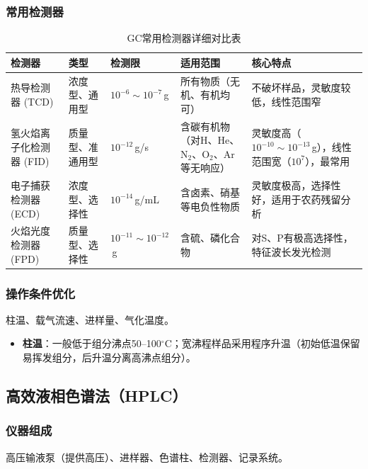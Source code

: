 \documentclass[11pt,a4paper]{article}
\begin{document}
\subsubsection{常用检测器}
\begin{table}[htbp]
\centering
\small
\begin{tabular}{>{\raggedright\arraybackslash}p{2.2cm} 
                >{\raggedright\arraybackslash}p{2.9cm} 
                >{\raggedright\arraybackslash}p{2.5cm} 
                >{\raggedright\arraybackslash}p{3.5cm} 
                >{\raggedright\arraybackslash}p{3.0cm}}
\toprule
\rowcolor{sectionColor!30}\textbf{检测器} & \textbf{类型} & \textbf{检测限} & \textbf{适用范围} & \textbf{核心特点} \\
\midrule
\rowcolor{tableRowOdd}热导检测器 (TCD) & 浓度型、通用型 & $10^{-6}\sim10^{-7}$\,g & 所有物质（无机、有机均可） & 不破坏样品，灵敏度较低，线性范围窄 \\
\rowcolor{tableRowEven}氢火焰离子化检测器 (FID) & 质量型、准通用型 & $10^{-12}$\,g/s & 含碳有机物（对H、He、N$_2$、O$_2$、Ar等无响应） & 灵敏度高（$10^{-10}\sim10^{-13}$\,g），线性范围宽（$10^{7}$），最常用 \\
\rowcolor{tableRowOdd}电子捕获检测器 (ECD) & 浓度型、选择性 & $10^{-14}$\,g/mL & 含卤素、硝基等电负性物质 & 灵敏度极高，选择性好，适用于农药残留分析 \\
\rowcolor{tableRowEven}火焰光度检测器 (FPD) & 质量型、选择性 & $10^{-11}\sim10^{-12}$\,g & 含硫、磷化合物 & 对S、P有极高选择性，特征波长发光检测 \\
\bottomrule
\end{tabular}
\caption{GC常用检测器详细对比表}
\end{table}

\subsubsection{操作条件优化}
柱温、载气流速、进样量、气化温度。
\begin{itemize}
    \item \textbf{柱温}：一般低于组分沸点50--100$^\circ$C；宽沸程样品采用程序升温（初始低温保留易挥发组分，后升温分离高沸点组分）。
\end{itemize}

\subsection{高效液相色谱法（HPLC）}

\subsubsection{仪器组成}
高压输液泵（提供高压）、进样器、色谱柱、检测器、记录系统。
\end{document}
